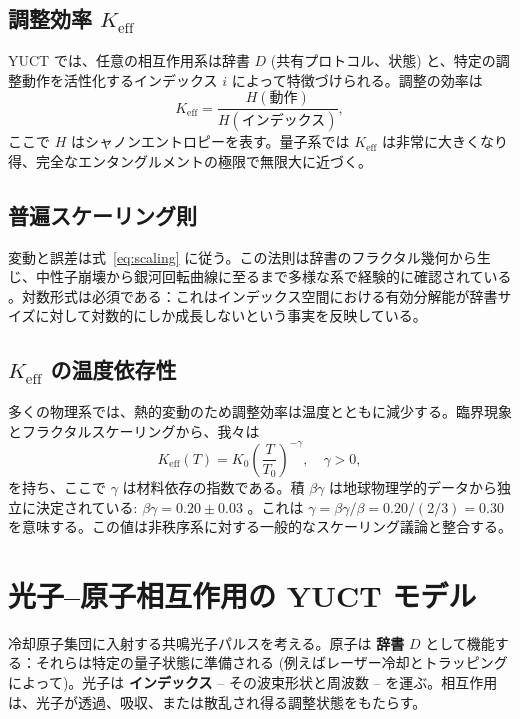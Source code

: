 \documentclass[12pt,a4paper]{article}
\newcommand{\Keff}{K_{\mathrm{eff}}}
\newcommand{\betagamma}{\beta\gamma}
\newcommand{\betac}{\beta}
\begin{document}
	\subsection{調整効率 \(\Keff\)}
	
	YUCT では、任意の相互作用系は辞書 \(D\) (共有プロトコル、状態) と、特定の調整動作を活性化するインデックス \(i\) によって特徴づけられる。調整の効率は
	\begin{equation}
		\Keff = \frac{H(\text{動作})}{H(\text{インデックス})},
	\end{equation}
	ここで \(H\) はシャノンエントロピーを表す。量子系では \(\Keff\) は非常に大きくなり得、完全なエンタングルメントの極限で無限大に近づく。
	
	\subsection{普遍スケーリング則}
	
	変動と誤差は式~\eqref{eq:scaling} に従う。この法則は辞書のフラクタル幾何から生じ、中性子崩壊から銀河回転曲線に至るまで多様な系で経験的に確認されている \cite{Yakushev2026c}。対数形式は必須である：これはインデックス空間における有効分解能が辞書サイズに対して対数的にしか成長しないという事実を反映している。
	
	\subsection{\(\Keff\) の温度依存性}
	
	多くの物理系では、熱的変動のため調整効率は温度とともに減少する。臨界現象とフラクタルスケーリングから、我々は
	\begin{equation}
		\Keff(T) = K_0 \left(\frac{T}{T_0}\right)^{-\gamma}, \quad \gamma > 0,
		\label{eq:K_T}
	\end{equation}
	を持ち、ここで \(\gamma\) は材料依存の指数である。積 \(\betac\gamma\) は地球物理学的データから独立に決定されている: \(\betagamma = 0.20 \pm 0.03\) \cite{Yakushev2026b}。これは \(\gamma = \betagamma / \betac = 0.20 / (2/3) = 0.30\) を意味する。この値は非秩序系に対する一般的なスケーリング議論と整合する。
	
	\section{光子–原子相互作用の YUCT モデル}
	
	冷却原子集団に入射する共鳴光子パルスを考える。原子は \textbf{辞書} \(D\) として機能する：それらは特定の量子状態に準備される (例えばレーザー冷却とトラッピングによって)。光子は \textbf{インデックス} – その波束形状と周波数 – を運ぶ。相互作用は、光子が透過、吸収、または散乱され得る調整状態をもたらす。
	
\end{document}
